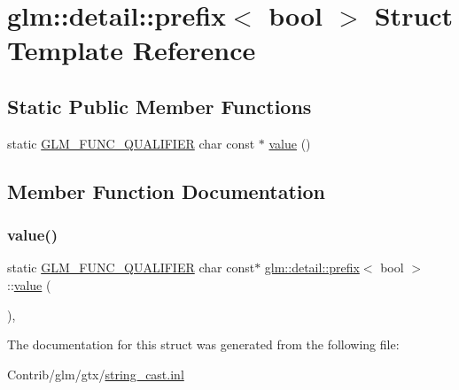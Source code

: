 \hypertarget{structglm_1_1detail_1_1prefix_3_01bool_01_4}{}\section{glm\+:\+:detail\+:\+:prefix$<$ bool $>$ Struct Template Reference}
\label{structglm_1_1detail_1_1prefix_3_01bool_01_4}
\subsection*{Static Public Member Functions}
\begin{DoxyCompactItemize}
\item 
static \mbox{\hyperlink{setup_8hpp_a33fdea6f91c5f834105f7415e2a64407}{G\+L\+M\+\_\+\+F\+U\+N\+C\+\_\+\+Q\+U\+A\+L\+I\+F\+I\+ER}} char const  $\ast$ \mbox{\hyperlink{structglm_1_1detail_1_1prefix_3_01bool_01_4_ab6d6392aa906c684f1abdda98830adad}{value}} ()
\end{DoxyCompactItemize}


\subsection{Member Function Documentation}
\mbox{\label{structglm_1_1detail_1_1prefix_3_01bool_01_4_ab6d6392aa906c684f1abdda98830adad}} 
\subsubsection{\texorpdfstring{value()}{value()}}
{\footnotesize\ttfamily static \mbox{\hyperlink{setup_8hpp_a33fdea6f91c5f834105f7415e2a64407}{G\+L\+M\+\_\+\+F\+U\+N\+C\+\_\+\+Q\+U\+A\+L\+I\+F\+I\+ER}} char const$\ast$ \mbox{\hyperlink{structglm_1_1detail_1_1prefix}{glm\+::detail\+::prefix}}$<$ bool $>$\+::\mbox{\hyperlink{_s_d_l__opengl__glext_8h_a8ad81492d410ff2ac11f754f4042150f}{value}} (\begin{DoxyParamCaption}{ }\end{DoxyParamCaption})\hspace{0.3cm}{\ttfamily [inline]}, {\ttfamily [static]}}



The documentation for this struct was generated from the following file\+:\begin{DoxyCompactItemize}
\item 
Contrib/glm/gtx/\mbox{\hyperlink{string__cast_8inl}{string\+\_\+cast.\+inl}}\end{DoxyCompactItemize}
